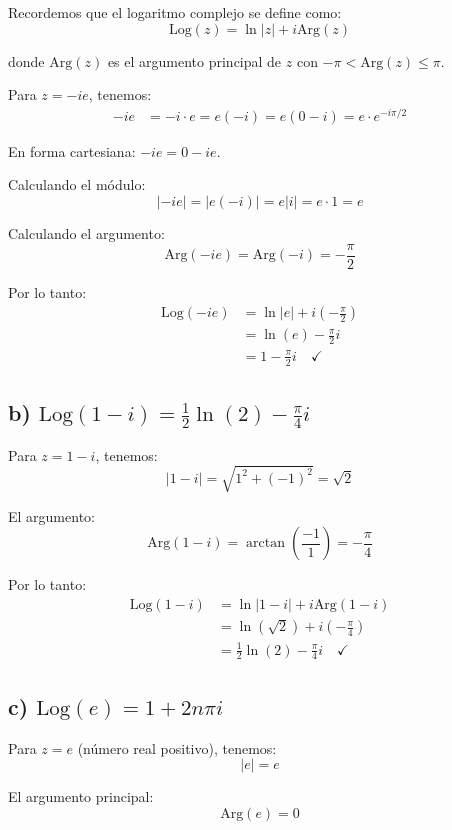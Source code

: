 \documentclass{article}
\begin{document}
Recordemos que el logaritmo complejo se define como:
$$\text{Log}(z) = \ln|z| + i\text{Arg}(z)$$

donde $\text{Arg}(z)$ es el argumento principal de $z$ con $-\pi < \text{Arg}(z) \leq \pi$.

Para $z = -ie$, tenemos:
\begin{align*}
-ie &= -i \cdot e = e(-i) = e(0 - i) = e \cdot e^{-i\pi/2}
\end{align*}

En forma cartesiana: $-ie = 0 - ie$.

Calculando el módulo:
$$|-ie| = |e(-i)| = e|i| = e \cdot 1 = e$$

Calculando el argumento:
$$\text{Arg}(-ie) = \text{Arg}(-i) = -\frac{\pi}{2}$$

Por lo tanto:
\begin{align*}
\text{Log}(-ie) &= \ln|e| + i\left(-\frac{\pi}{2}\right) \\
               &= \ln(e) - \frac{\pi}{2}i \\
               &= 1 - \frac{\pi}{2}i \quad \checkmark
\end{align*}

\subsection*{b) $\text{Log}(1 - i) = \frac{1}{2}\ln(2) - \frac{\pi}{4}i$}

Para $z = 1 - i$, tenemos:
$$|1 - i| = \sqrt{1^2 + (-1)^2} = \sqrt{2}$$

El argumento:
$$\text{Arg}(1 - i) = \arctan\left(\frac{-1}{1}\right) = -\frac{\pi}{4}$$

Por lo tanto:
\begin{align*}
\text{Log}(1 - i) &= \ln|1 - i| + i\text{Arg}(1 - i) \\
                 &= \ln(\sqrt{2}) + i\left(-\frac{\pi}{4}\right) \\
                 &= \frac{1}{2}\ln(2) - \frac{\pi}{4}i \quad \checkmark
\end{align*}

\subsection*{c) $\text{Log}(e) = 1 + 2n\pi i$}

Para $z = e$ (número real positivo), tenemos:
$$|e| = e$$

El argumento principal:
$$\text{Arg}(e) = 0$$
\end{document}

